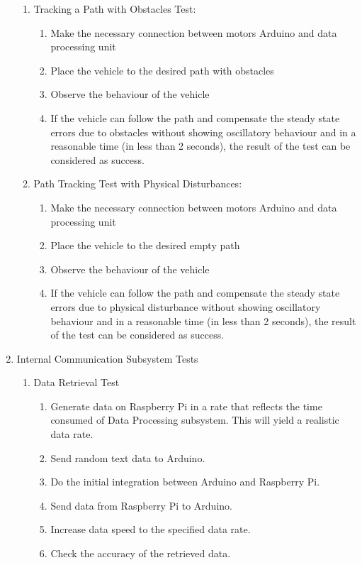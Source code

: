 \documentclass[a4paper,12pt]{article}
\begin{document}
\begin{enumerate}
\begin{enumerate}
			
		\item Tracking a Path with Obstacles Test:	\label{test:e}	
			\begin{enumerate}
				\item Make the necessary connection between motors Arduino and data processing unit  
				\item Place the vehicle to the desired path with obstacles  
				\item Observe the behaviour of the vehicle  
				\item If the vehicle can follow the path and compensate the steady state errors due to obstacles without showing oscillatory behaviour and in a reasonable time (in less than 2 seconds), the result of the test can be considered as success.  
			\end{enumerate}
				
		
		\item Path Tracking Test with Physical Disturbances: \label{test:f}	
			\begin{enumerate}
				\item Make the necessary connection between motors Arduino and data processing unit  
				\item Place the vehicle to the desired empty path   
				\item Observe the behaviour of the vehicle  
				\item If the vehicle can follow the path and compensate the steady state errors due to physical disturbance without showing oscillatory behaviour and in a reasonable time (in less than 2 seconds), the result of the test can be considered as success.  
			\end{enumerate}
		
		\end{enumerate}
		
		
		\item {Internal Communication Subsystem Tests}
		\begin{enumerate}
			 \item Data Retrieval Test
			\begin{enumerate}
					\item Generate data on Raspberry Pi in a rate that reflects the time consumed of Data Processing subsystem. This will yield a realistic data rate.  
				\item Send random text data to Arduino.  
				\item Do the initial integration between Arduino and Raspberry Pi.  
				\item Send data from Raspberry Pi to Arduino.  
				\item Increase data speed to the specified data rate.  
				\item Check the accuracy of the retrieved data. 
	\end{enumerate}
		\end{enumerate}
	 

\end{enumerate}
\end{document}
